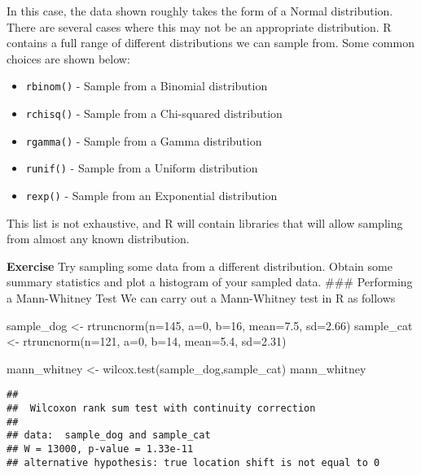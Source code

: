 \documentclass[
]{book}
\newenvironment{Shaded}{\begin{snugshade}}{\end{snugshade}}
\newcommand{\AttributeTok}[1]{\textcolor[rgb]{0.77,0.63,0.00}{#1}}
\newcommand{\DecValTok}[1]{\textcolor[rgb]{0.00,0.00,0.81}{#1}}
\newcommand{\FloatTok}[1]{\textcolor[rgb]{0.00,0.00,0.81}{#1}}
\newcommand{\FunctionTok}[1]{\textcolor[rgb]{0.00,0.00,0.00}{#1}}
\newcommand{\NormalTok}[1]{#1}
\newcommand{\OtherTok}[1]{\textcolor[rgb]{0.56,0.35,0.01}{#1}}
\providecommand{\tightlist}{%
  \setlength{\itemsep}{0pt}\setlength{\parskip}{0pt}}
\begin{document}
In this case, the data shown roughly takes the form of a Normal distribution. There are several cases where this may not be an appropriate distribution. R contains a full range of different distributions we can sample from. Some common choices are shown below:

\begin{itemize}
\tightlist
\item
  \texttt{rbinom()} - Sample from a Binomial distribution
\item
  \texttt{rchisq()} - Sample from a Chi-squared distribution
\item
  \texttt{rgamma()} - Sample from a Gamma distribution
\item
  \texttt{runif()} - Sample from a Uniform distribution
\item
  \texttt{rexp()} - Sample from an Exponential distribution
\end{itemize}

This list is not exhaustive, and R will contain libraries that will allow sampling from almost any known distribution.

\textbf{Exercise}
Try sampling some data from a different distribution. Obtain some summary statistics and plot a histogram of your sampled data.
\#\#\# Performing a Mann-Whitney Test
We can carry out a Mann-Whitney test in R as follows

\begin{Shaded}
\begin{Highlighting}[]
\NormalTok{sample\_dog }\OtherTok{\textless{}{-}} \FunctionTok{rtruncnorm}\NormalTok{(}\AttributeTok{n=}\DecValTok{145}\NormalTok{, }\AttributeTok{a=}\DecValTok{0}\NormalTok{, }\AttributeTok{b=}\DecValTok{16}\NormalTok{, }\AttributeTok{mean=}\FloatTok{7.5}\NormalTok{, }\AttributeTok{sd=}\FloatTok{2.66}\NormalTok{)}
\NormalTok{sample\_cat }\OtherTok{\textless{}{-}} \FunctionTok{rtruncnorm}\NormalTok{(}\AttributeTok{n=}\DecValTok{121}\NormalTok{, }\AttributeTok{a=}\DecValTok{0}\NormalTok{, }\AttributeTok{b=}\DecValTok{14}\NormalTok{, }\AttributeTok{mean=}\FloatTok{5.4}\NormalTok{, }\AttributeTok{sd=}\FloatTok{2.31}\NormalTok{)}

\NormalTok{mann\_whitney }\OtherTok{\textless{}{-}} \FunctionTok{wilcox.test}\NormalTok{(sample\_dog,sample\_cat)}
\NormalTok{mann\_whitney}
\end{Highlighting}
\end{Shaded}

\begin{verbatim}
## 
##  Wilcoxon rank sum test with continuity correction
## 
## data:  sample_dog and sample_cat
## W = 13000, p-value = 1.33e-11
## alternative hypothesis: true location shift is not equal to 0
\end{verbatim}
\end{document}
